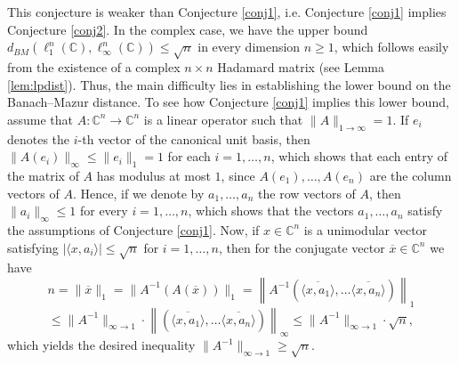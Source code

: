 \documentclass[12pt, a4paper]{article}
\theoremstyle{plain} %
\theoremstyle{definition} %
\theoremstyle{remark} %
\begin{document}
This conjecture is weaker than Conjecture \ref{conj1}, i.e. Conjecture \ref{conj1} implies Conjecture \ref{conj2}. In the complex case, we have the upper bound $d_{BM}(\ell_{1}^n(\mathbb{C}), \ell_{\infty}^n(\mathbb{C})) \leq \sqrt{n}$ in every dimension $n \geq 1$, which follows easily from the existence of a complex $n \times n$ Hadamard matrix (see Lemma \ref{lem:lpdist}). Thus, the main difficulty lies in establishing the lower bound on the Banach--Mazur distance. To see how Conjecture \ref{conj1} implies this lower bound, assume that  $A: \mathbb{C}^n \to \mathbb{C}^n$ is a linear operator such that $\|A\|_{1 \to \infty}=1$. If $e_i$ denotes the $i$-th vector of the canonical unit basis, then $\|A(e_i)\|_{\infty} \leq \|e_i\|_1=1$ for each $i=1, \ldots, n$, which shows that each entry of the matrix of $A$ has modulus at most $1$, since $A(e_1), \ldots, A(e_n)$ are the column vectors of $A$. Hence, if we denote by $a_1, \ldots, a_n$ the row vectors of $A$, then $\|a_i\|_{\infty} \leq 1$ for every $i=1, \ldots, n$, which shows that the vectors $a_1, \ldots, a_n$ satisfy the assumptions of Conjecture \ref{conj1}. Now, if $x \in \mathbb{C}^n$ is a unimodular vector satisfying $|\langle x, a_i \rangle | \leq \sqrt{n}$ for $i=1, \ldots, n$, then for the conjugate vector $\overline{x} \in \mathbb{C}^n$ we have
$$n=\|\overline{x}\|_1=\|A^{-1}(A(\overline{x}))\|_1 = \left \| A^{-1}\left ( \overline{\langle x, a_1 \rangle}, \ldots \overline{\langle x, a_n \rangle} \right ) \right \|_1$$
 $$\leq \|A^{-1}\|_{\infty \to 1} \cdot \left \| \left ( \overline{\langle x, a_1 \rangle}, \ldots \overline{\langle x, a_n \rangle} \right ) \right \|_{\infty} \leq \|A^{-1}\|_{\infty \to 1} \cdot \sqrt{n},$$
which yields the desired inequality $\|A^{-1}\|_{\infty \to 1} \geq \sqrt{n}$.
\end{document}
